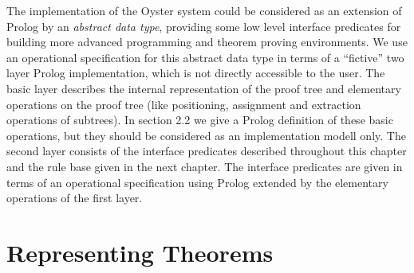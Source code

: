 \documentclass[11pt]{report}
\begin{document}
 The implementation of the Oyster system could be considered as an 
 extension of Prolog by an \emph{abstract data type},
 providing some low level interface predicates for building
 more advanced programming and theorem proving environments.
 We use an operational specification for this abstract data type 
 in terms of a ``fictive'' two layer Prolog implementation, which is
 not directly accessible to the user. The basic layer describes 
 the internal representation of the proof tree and elementary
 operations on the proof tree (like positioning,
 assignment and extraction operations of subtrees).
 In section 2.2 we give a Prolog definition of these basic operations,
 but they should be considered as an implementation modell
 only. The second layer consists of the interface predicates
 described throughout this chapter and the rule base given in 
 the next chapter. The interface predicates are given in 
 terms of an operational specification using Prolog extended by
 the elementary operations of the first layer.
 
 \section{Representing Theorems}
 
\end{document}

